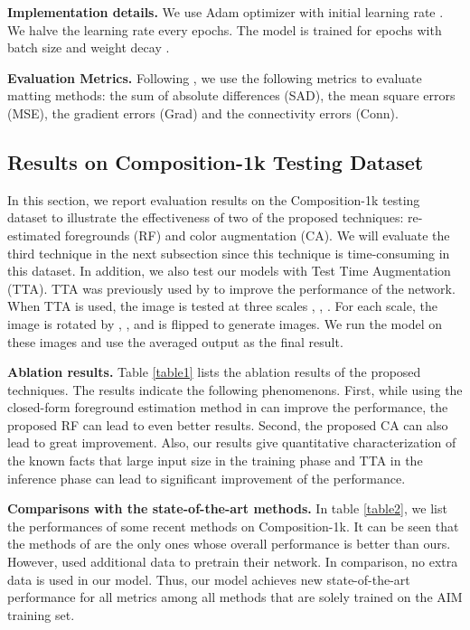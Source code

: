 \documentclass{article}
\theoremstyle{plain}
\begin{document}
\textbf{Implementation details.}
We use Adam optimizer \cite{Kingma2015Adam}
with initial learning rate .
We halve the learning rate every  epochs.
The model is trained for  epochs with
batch size 
and weight decay .


\textbf{Evaluation Metrics.}
Following \cite{Xu2017DeepImageMatting,Houjj2019ContextAwareImageMatting}, we use the following metrics to evaluate matting methods:
the sum of absolute differences (SAD), the mean square errors (MSE), the gradient errors (Grad) and the connectivity errors (Conn).




\subsection{Results on Composition-1k Testing Dataset}
In this section, we report evaluation results on the Composition-1k testing dataset \cite{Xu2017DeepImageMatting}
to illustrate the effectiveness
of two of the proposed techniques: re-estimated foregrounds (RF) and color augmentation (CA).
We will evaluate the third technique in the next subsection since this technique is time-consuming in this dataset.
In addition,
we also test our models with Test Time Augmentation (TTA).
TTA was previously used by \cite{Tang2019Learning-Based,Forte2020FBA} to improve the performance of the network.
When TTA is used, the image is tested at three scales , , .
For each scale, the image is rotated by , , and is flipped to generate  images.
We run the model on these  images and use the averaged output as the final result.




\textbf{Ablation results.}
Table \ref{table1} lists the ablation results of the proposed techniques.
The results indicate the following phenomenons.
First,
while using the closed-form foreground estimation method in \cite{Levin2008AClosed-Form}
can improve the performance,
the proposed RF can lead to even better results.
Second,
the proposed CA can also lead to great improvement.
Also,
our results give quantitative characterization of the known facts
that
large input size in the training phase and TTA in the inference phase can lead to 
significant improvement of the performance.



\textbf{Comparisons with the state-of-the-art methods.}
In table \ref{table2}, we list the performances of some recent methods on Composition-1k.
It can be seen that 
the methods of \cite{Liu2021Long-RangeFeaturePropagating}
are the only ones whose overall performance is better than ours.
However, 
\cite{Liu2021Long-RangeFeaturePropagating} used additional data to pretrain their network.
In comparison, no extra data is used in our model.
Thus, our model achieves new state-of-the-art performance for all  metrics among all methods that are solely trained on the AIM training set.
\end{document}
